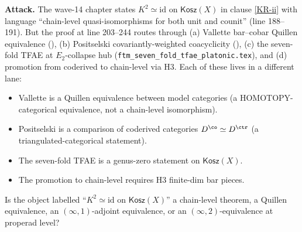 \documentclass[11pt]{article}
\theoremstyle{definition}
\newcommand{\Kosz}{\mathsf{Kosz}}
\newcommand{\id}{\mathrm{id}}
\begin{document}
\textbf{Attack.} The wave-14 chapter states $K^{2}\simeq\id$ on $\Kosz(X)$ in
clause \ref{KR-ii} with language ``chain-level quasi-isomorphisms for
both unit and counit'' (line 188--191). But the proof at line 203--244
routes through (a) Vallette bar--cobar Quillen equivalence
(\cite{Val16}), (b) Positselski covariantly-weighted coacyclicity
(\cite{Positselski2011}), (c) the seven-fold TFAE at
$E_2$-collapse hub (\texttt{ftm\_seven\_fold\_tfae\_platonic.tex}),
and (d) promotion from coderived to chain-level via H3. Each of
these lives in a different lane:
\begin{itemize}
\item Vallette is a Quillen equivalence between model categories
  (a HOMOTOPY-categorical equivalence, not a chain-level isomorphism).
\item Positselski is a comparison of coderived categories
  $D^{\co}\simeq D^{\ctr}$ (a triangulated-categorical statement).
\item The seven-fold TFAE is a genus-zero statement on $\Kosz(X)$.
\item The promotion to chain-level requires H3 finite-dim bar pieces.
\end{itemize}
Is the object labelled ``$K^{2}\simeq\id$ on $\Kosz(X)$'' a chain-level
theorem, a Quillen equivalence, an $(\infty,1)$-adjoint equivalence,
or an $(\infty,2)$-equivalence at properad level?
\end{document}
